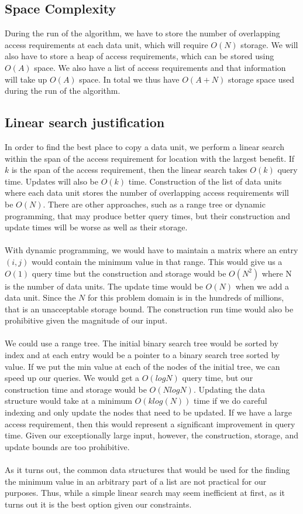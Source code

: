 \subsection{Space Complexity}

During the run of the algorithm, we have to store the number of overlapping access requirements at each data unit, which will require $O(N)$ storage. We will also have to store a heap of access requirements, which can be stored using $O(A)$ space. We also have a list of access requirements and that information will take up $O(A)$ space. In total we thus have $O(A + N)$ storage space used during the run of the algorithm. 


\subsection{Linear search justification}

In order to find the best place to copy a data unit, we perform a linear search within the span of the access requirement for location with the largest benefit. If $k$ is the span of the access requirement, then the linear search takes $O(k)$ query time. Updates will also be $O(k)$ time. Construction of the list of data units where each data unit stores the number of overlapping access requirements will be $O(N)$. There are other approaches, such as a range tree or dynamic programming, that may produce better query times, but their construction and update times will be worse as well as their storage. \\
\\
With dynamic programming, we would have to maintain a matrix where an entry
$(i,j)$ would contain the minimum value in that range. This would give us a
$O(1)$ query time but the construction and storage would be $O(N^2)$ where N is
the number of data units. The update time would be $O(N)$ when we add a data
unit. Since the $N$ for this problem domain is in the hundreds of millions,
that is an unacceptable storage bound. The construction run time would also be
prohibitive given the magnitude of our input. \\
\\
We could use a range tree. The initial binary search tree would be sorted by
index and at each entry would be a pointer to a binary search tree sorted by
value. If we put the min value at each of the nodes of the initial tree, we can
speed up our queries. We would get a $O(log N)$ query time, but our
construction time and storage would be $O(N log N)$. Updating the data
structure would take at a minimum $O(k log(N))$ time if we do careful indexing
and only update the nodes that need to be updated. If we have a large access
requirement, then this would represent a significant improvement in query time.
Given our exceptionally large input, however, the construction, storage, and
update bounds are too prohibitive.  \\
\\
As it turns out, the common data structures that would be used for the finding the minimum value in an arbitrary part of a list are not practical for our purposes. Thus, while a simple linear search may seem inefficient at first, as it turns out it is the best option given our constraints. 
